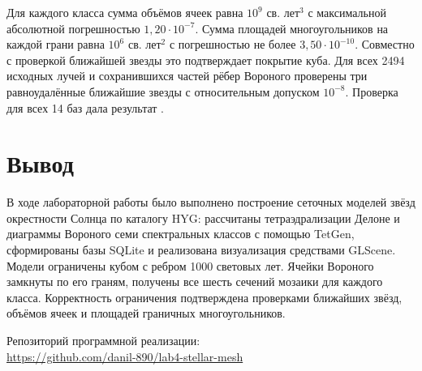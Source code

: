 Для каждого класса сумма объёмов ячеек равна $10^9$ св. лет$^3$ с максимальной абсолютной погрешностью $1{,}20\cdot10^{-7}$. Сумма площадей многоугольников на каждой грани равна $10^6$ св. лет$^2$ с погрешностью не более $3{,}50\cdot10^{-10}$. Совместно с проверкой ближайшей звезды это подтверждает покрытие куба. Для всех 2494 исходных лучей и сохранившихся частей рёбер Вороного проверены три равноудалённые ближайшие звезды с относительным допуском $10^{-8}$. Проверка  для всех 14 баз дала результат .

\section{Вывод}
В ходе лабораторной работы было выполнено построение сеточных моделей звёзд окрестности Солнца по каталогу HYG: рассчитаны тетраэдрализации Делоне и диаграммы Вороного семи спектральных классов с помощью TetGen, сформированы базы SQLite и реализована визуализация средствами GLScene. Модели ограничены кубом с ребром 1000 световых лет. Ячейки Вороного замкнуты по его граням, получены все шесть сечений мозаики для каждого класса. Корректность ограничения подтверждена проверками ближайших звёзд, объёмов ячеек и площадей граничных многоугольников.
\par\noindent Репозиторий программной реализации:\\
\url{https://github.com/danil-890/lab4-stellar-mesh}

